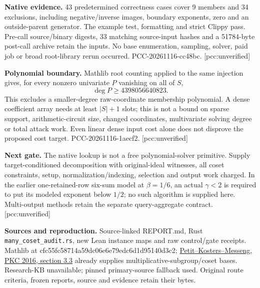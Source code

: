 \documentclass[10pt]{article}
\begin{document}
\textbf{Native evidence.} 43 predetermined correctness cases cover 9 members
and 34 exclusions, including negative/inverse images, boundary exponents,
zero and an outside-parent generator. The example test, formatting and
strict Clippy pass. Pre-call source/binary digests, 33 matching source-input
hashes and a 51784-byte post-call archive retain the inputs. No base
enumeration, sampling, solver, paid job or broad root-library rerun occurred.
PCC-20261116-cc48bc. [pcc:unverified]

\textbf{Polynomial boundary.} Mathlib root counting applied to the same
injection gives, for every nonzero univariate $P$ vanishing on all of $S$,
\[
 \deg P\ge4398056640823.
\]
This excludes a smaller-degree raw-coordinate membership polynomial.
A dense coefficient array needs at least $|S|+1$ slots; this is not a
bound on sparse support, arithmetic-circuit size, changed coordinates,
multivariate solving degree or total attack work. Even linear dense input
cost alone does not disprove the proposed cost target.
PCC-20261116-1aecf2. [pcc:unverified]

\textbf{Next gate.} The native lookup is not a free polynomial-solver
primitive. Supply target-conditioned decomposition with original-ideal
witnesses, all coset constraints, setup, normalization/indexing, selection
and output work charged. In the earlier one-retained-row six-sum model at
$\beta=1/6$, an actual $\gamma<2$ is required to put its modeled exponent
below $1/2$; no such algorithm is supplied here. Multi-output methods retain
the separate query-aggregate contract. [pcc:unverified]

\textbf{Sources and reproduction.} Source-linked REPORT.md, Rust
\texttt{many\_coset\_audit.rs}, new Lean instance maps and raw control/gate
receipts. Mathlib at cfc55fc58714a59dc06e6e79edc6d1d95140d3c2;
\href{https://people.maths.ox.ac.uk/petit/files/16PKC_primeECDLP.pdf}{Petit--Kosters--Messeng,
PKC 2016, section 3.3} already supplies multiplicative-subgroup/coset bases.
Research-KB unavailable; pinned primary-source fallback used. Original route
criteria, frozen reports, source and evidence retain their bytes.
\end{document}
